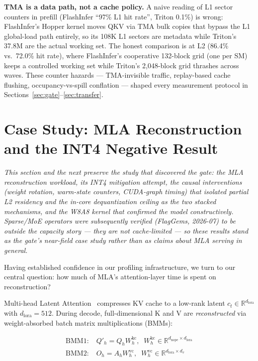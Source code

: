 \documentclass[10pt,twocolumn]{article}
\begin{document}
\textbf{TMA is a data path, not a cache policy.}
\label{sec:tma}\label{sec:prefill_ncu}A naive reading of L1 sector counters in prefill (FlashInfer ``97\% L1 hit rate'', Triton 0.1\%) is wrong: FlashInfer's Hopper kernel moves QKV via TMA bulk copies that bypass the L1 global-load path entirely, so its 108K L1 sectors are metadata while Triton's 37.8M are the actual working set.  The honest comparison is at L2 (86.4\% vs.\ 72.0\% hit rate), where FlashInfer's cooperative 132-block grid (one per SM) keeps a controlled working set while Triton's 2{,}048-block grid thrashes across waves.  These counter hazards --- TMA-invisible traffic, replay-based cache flushing, occupancy-vs-spill conflation --- shaped every measurement protocol in Sections~\ref{sec:gate}--\ref{sec:transfer}.

\section{Case Study: MLA Reconstruction and the INT4 Negative Result}
\label{sec:casestudy}
\label{sec:recon}

\emph{This section and the next preserve the study that discovered the gate: the MLA reconstruction workload, its INT4 mitigation attempt, the causal interventions (weight rotation, warm-state counters, CUDA-graph timing) that isolated partial L2 residency and the in-core dequantization ceiling as the two stacked mechanisms, and the W8A8 kernel that confirmed the model constructively.  Sparse/MoE operators were subsequently verified (FlagGems, 2026-07) to be outside the capacity story --- they are not cache-limited --- so these results stand as the gate's near-field case study rather than as claims about MLA serving in general.}

Having established confidence in our profiling infrastructure, we turn to our central question: how much of MLA's attention-layer time is spent on reconstruction?

Multi-head Latent Attention~\cite{deepseekv2} compresses KV cache to a low-rank latent $c_t \in \mathbb{R}^{d_\text{lora}}$ with $d_\text{lora}=512$.  During decode, full-dimensional K and V are \emph{reconstructed} via weight-absorbed batch matrix multiplications (BMMs):

\begin{align}
\text{BMM1:} \; & Q'_h = Q_h W^\text{kc}_h, \;\; W^\text{kc}_h \!\in\! \mathbb{R}^{d_\text{nope} \times d_\text{lora}} \nonumber \\
\text{BMM2:} \; & O_h = A_h W^\text{vc}_h, \;\; W^\text{vc}_h \!\in\! \mathbb{R}^{d_\text{lora} \times d_v} \nonumber
\end{align}
\end{document}
